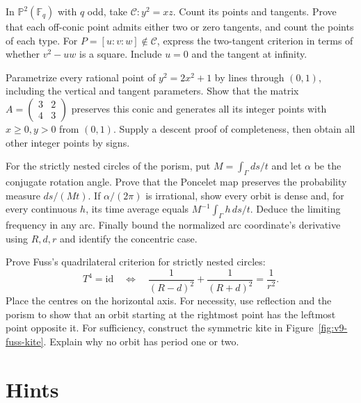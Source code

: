 \begin{exercise}[$\star\star$]\label{ex:v9-finite-conic-tangents}
In $\mathbb P^2(\mathbb F_q)$ with $q$ odd, take $\mathcal C:y^2=xz$. Count its points and tangents. Prove that each off-conic point admits either two or zero tangents, and count the points of each type. For $P=[u:v:w]\notin\mathcal C$, express the two-tangent criterion in terms of whether $v^2-uw$ is a square. Include $u=0$ and the tangent at infinity.
\end{exercise}
\begin{exercise}[$\star\star\star$]\label{ex:v9-pell-conic}
Parametrize every rational point of $y^2=2x^2+1$ by lines through $(0,1)$, including the vertical and tangent parameters. Show that the matrix $A=\left(\begin{smallmatrix}3&2\\4&3\end{smallmatrix}\right)$ preserves this conic and generates all its integer points with $x\ge0,y>0$ from $(0,1)$. Supply a descent proof of completeness, then obtain all other integer points by signs.
\end{exercise}
\begin{exercise}[$\star\star$]\label{ex:v9-poncelet-frequency}
For the strictly nested circles of the porism, put $M=\int_\Gamma ds/t$ and let $\alpha$ be the conjugate rotation angle. Prove that the Poncelet map preserves the probability measure $ds/(Mt)$. If $\alpha/(2\pi)$ is irrational, show every orbit is dense and, for every continuous $h$, its time average equals $M^{-1}\int_\Gamma h\,ds/t$. Deduce the limiting frequency in any arc. Finally bound the normalized arc coordinate's derivative using $R,d,r$ and identify the concentric case.
\end{exercise}
\begin{exercise}[$\star\star\star$]\label{ex:v9-fuss-quadrilateral}
Prove Fuss's quadrilateral criterion for strictly nested circles:
\[
T^4=\mathrm{id}\quad\Longleftrightarrow\quad
\frac1{(R-d)^2}+\frac1{(R+d)^2}=\frac1{r^2}.
\]
Place the centres on the horizontal axis. For necessity, use reflection and the porism to show that an orbit starting at the rightmost point has the leftmost point opposite it. For sufficiency, construct the symmetric kite in Figure~\ref{fig:v9-fuss-kite}. Explain why no orbit has period one or two.
\end{exercise}

\section{Hints}

